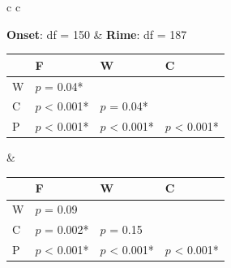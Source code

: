 \documentclass[man,floatsintext]{apa6}
\begin{document}
\begin{figure}[h]
  \begin{center}
    \begin{tabular}{ c c}

      \textbf{Onset}: df = 150 & \textbf{Rime}: df = 187\\




      {
      \small

      \begin{tabular}{| l | l |  l | l |}
        \hline
        & F              & W           & C \\
        \hline
        W & $p$ = 0.04*  &             &\\
        \hline
        C & $p$ < 0.001* &  $p$ = 0.04* & \\
        \hline
        P & $p$ < 0.001* &  $p$ < 0.001* &  $p$ < 0.001* \\
        \hline
      \end{tabular}
      } &




          {
          \small
          \begin{tabular}{| l | l |  l | l |}
            \hline
            & F               & W           & C \\
            \hline
            W &  $p$ = 0.09 &             &\\
            \hline
            C &  $p$ = 0.002* &  $p$ = 0.15 &\\
            \hline
            P &  $p$ < 0.001* &  $p$ < 0.001* &  $p$ < 0.001*\\
            \hline
          \end{tabular}
      }\\


\end{tabular}
\end{center}
\end{figure}
\end{document}
